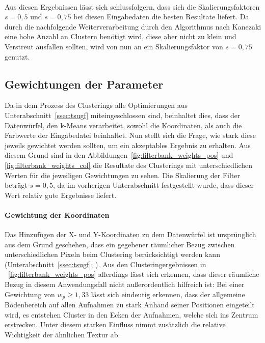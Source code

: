 \paragraph{}
Aus diesen Ergebnissen lässt sich schlussfolgern, dass sich die Skalierungsfaktoren $s=0,5$ und $s=0,75$ bei diesen Eingabedaten die besten Resultate liefert. Da durch die nachfolgende Weiterverarbeitung durch den Algorithmus nach Kanezaki eine hohe Anzahl an Clustern benötigt wird, diese aber nicht zu klein und Verstreut ausfallen sollten, wird von nun an ein Skalierungsfaktor von $s=0,75$ genutzt.

\subsection{Gewichtungen der Parameter}
\label{ssec:initialization_filterweight}

Da in dem Prozess des Clusterings alle Optimierungen aus Unterabschnitt~\ref{ssec:tsugf} miteingeschlossen sind, beinhaltet dies, dass der Datenwürfel, den k-Means verarbeitet, sowohl die Koordinaten, als auch die Farbwerte der Eingabedatei beinhaltet. Nun stellt sich die Frage, wie stark diese jeweils gewichtet werden sollten, um ein akzeptables Ergebnis zu erhalten. Aus diesem Grund sind in den Abbildungen~\ref{fig:filterbank_weights_pos} und \ref{fig:filterbank_weights_col} die Resultate des Clusterings mit unterschiedlichen Werten für die jeweiligen Gewichtungen zu sehen. Die Skalierung der Filter beträgt $s=0,5$, da im vorherigen Unterabschnitt festgestellt wurde, dass dieser Wert relativ gute Ergebnisse liefert.

\paragraph{Gewichtung der Koordinaten}
Das Hinzufügen der X- und Y-Koordinaten zu dem Datenwürfel ist ursprünglich aus dem Grund geschehen, dass ein gegebener räumlicher Bezug zwischen unterschiedlichen Pixeln beim Clustering berücksichtigt werden kann (\vgl Unterabschnitt~\ref{ssec:tsugf}; \cite{jain_91}). Aus den Clusteringergebnissen in \figurename~\ref{fig:filterbank_weights_pos} allerdings lässt sich erkennen, dass dieser räumliche Bezug in diesem Anwendungsfall nicht außerordentlich hilfreich ist: Bei einer Gewichtung von $w_p\geq1,33$ lässt sich eindeutig erkennen, dass der allgemeine Bodenbereich auf allen Aufnahmen zu stark Anhand seiner Positionen eingeteilt wird, es entstehen Cluster in den Ecken der Aufnahmen, welche sich ins Zentrum erstrecken. Unter diesem starken Einfluss nimmt zusätzlich die relative Wichtigkeit der ähnlichen Textur ab.

